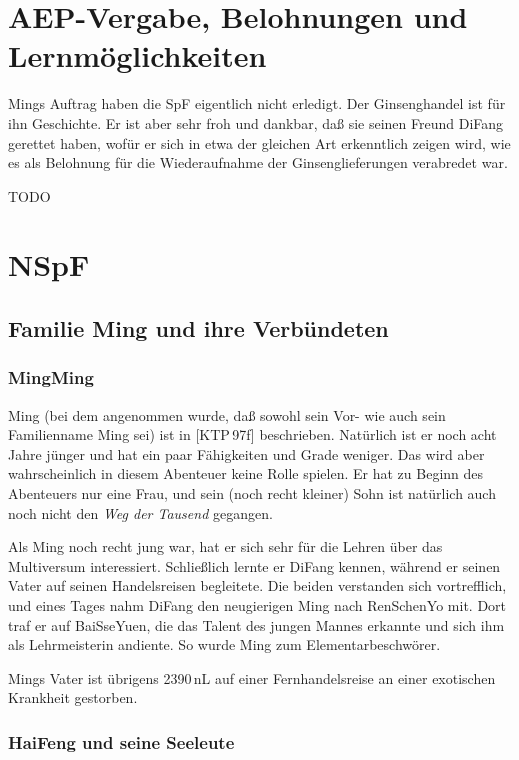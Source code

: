 \documentclass[
a4paper,
twoside,
DIV=calc,
BCOR=4mm,
fontsize=9pt,
twocolumn=on,
titlepage=on,
parskip=half
]{scrartcl}
\begin{document}
\section{AEP-Vergabe, Belohnungen und Lernmöglichkeiten}

Mings Auftrag haben die SpF eigentlich nicht erledigt. Der
Ginsenghandel ist für ihn Geschichte. Er ist aber sehr froh und
dankbar, daß sie seinen Freund DiFang gerettet haben, wofür er sich in
etwa der gleichen Art erkenntlich zeigen wird, wie es als Belohnung
für die Wiederaufnahme der Ginsenglieferungen verabredet war.

TODO

\section{NSpF}

\subsection{Familie Ming und ihre Verbündeten}

\subsubsection{MingMing}

Ming (bei dem angenommen wurde, daß sowohl sein Vor- wie auch sein
Familienname Ming sei) ist in [KTP\,97f] beschrieben. Natürlich ist er
noch acht Jahre jünger und hat ein paar Fähigkeiten und Grade
weniger. Das wird aber wahrscheinlich in diesem Abenteuer keine Rolle
spielen. Er hat zu Beginn des Abenteuers nur eine Frau, und sein (noch
recht kleiner) Sohn ist natürlich auch noch nicht den \emph{Weg der
  Tausend} gegangen.

Als Ming noch recht jung war, hat er sich sehr für die Lehren über das
Multiversum interessiert. Schließlich lernte er DiFang kennen, während
er seinen Vater auf seinen Handelsreisen begleitete. Die beiden
verstanden sich vortrefflich, und eines Tages nahm DiFang den
neugierigen Ming nach RenSchenYo mit. Dort traf er auf BaiSseYuen, die
das Talent des jungen Mannes erkannte und sich ihm als Lehrmeisterin
andiente. So wurde Ming zum Elementarbeschwörer.

Mings Vater ist übrigens 2390\,nL auf einer Fernhandelsreise an einer
exotischen Krankheit gestorben.

\subsubsection{HaiFeng und seine Seeleute}
\end{document}
